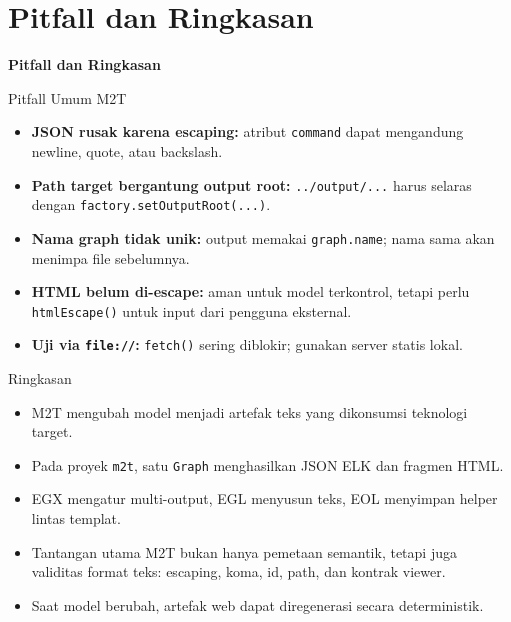 \documentclass[aspectratio=169, table]{beamer}
\begin{document}
\section{Pitfall dan Ringkasan}
\begin{frame}{\hfill}
	\centering
	\Huge{\textbf{Pitfall dan Ringkasan}}
\end{frame}

\begin{frame}{Pitfall Umum M2T}
\vspace{6pt}
\begin{itemize}
  \item \textbf{JSON rusak karena escaping:} atribut \texttt{command} dapat mengandung newline, quote, atau backslash.
  \item \textbf{Path target bergantung output root:} \texttt{../output/...} harus selaras dengan \texttt{factory.setOutputRoot(...)}.
  \item \textbf{Nama graph tidak unik:} output memakai \texttt{graph.name}; nama sama akan menimpa file sebelumnya.
  \item \textbf{HTML belum di-escape:} aman untuk model terkontrol, tetapi perlu \texttt{htmlEscape()} untuk input dari pengguna eksternal.
  \item \textbf{Uji via \texttt{file://}:} \texttt{fetch()} sering diblokir; gunakan server statis lokal.
\end{itemize}
\end{frame}

\begin{frame}{Ringkasan}
\vspace{6pt}
\begin{itemize}
  \item M2T mengubah model menjadi artefak teks yang dikonsumsi teknologi target.
  \item Pada proyek \texttt{m2t}, satu \texttt{Graph} menghasilkan JSON ELK dan fragmen HTML.
  \item EGX mengatur multi-output, EGL menyusun teks, EOL menyimpan helper lintas templat.
  \item Tantangan utama M2T bukan hanya pemetaan semantik, tetapi juga validitas format teks: escaping, koma, id, path, dan kontrak viewer.
  \item Saat model berubah, artefak web dapat diregenerasi secara deterministik.
\end{itemize}
\end{frame}
\end{document}
